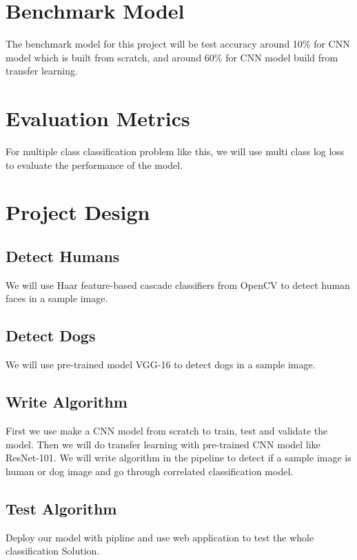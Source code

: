 \documentclass{article}
\begin{document}
\section{Benchmark Model}
The benchmark model for this project will be test accuracy around 10\% for CNN model which is built from scratch, and around 60\% for CNN model build from transfer learning.

\section{Evaluation Metrics}
For multiple class classification problem like this, we will use multi class log loss to evaluate the performance of the model.

\section{Project Design}

\subsection{Detect Humans}
We will use Haar feature-based cascade classifiers from OpenCV to detect human faces in a sample image.
\subsection{Detect Dogs}
We will use pre-trained model VGG-16 to detect dogs in a sample image.

\subsection{Write Algorithm}
First we use make a CNN model from scratch to train, test and validate the model. Then we will do transfer learning with pre-trained CNN model like ResNet-101.
We will write algorithm in the pipeline to detect if a sample image is human or dog image and go through correlated classification model.

\subsection{Test Algorithm}
Deploy our model with pipline and use web application to test the whole classification Solution.
\end{document}
